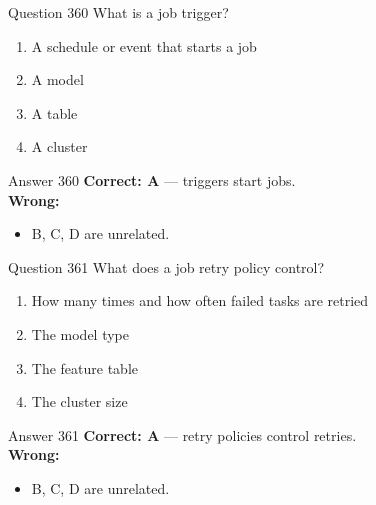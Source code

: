 \documentclass[aspectratio=169,11pt]{beamer}
\begin{document}
	\begin{frame}{Question 360}
		What is a job trigger?
		\begin{enumerate}[label=\Alph*.]
			\item A schedule or event that starts a job
			\item A model
			\item A table
			\item A cluster
		\end{enumerate}
	\end{frame}
	\begin{frame}{Answer 360}
		\textbf{Correct: A} --- triggers start jobs.\\
		\vspace{0.5em}
		\textbf{Wrong:}
		\begin{itemize}
			\item B, C, D are unrelated.
		\end{itemize}
	\end{frame}
	
	\begin{frame}{Question 361}
		What does a job retry policy control?
		\begin{enumerate}[label=\Alph*.]
			\item How many times and how often failed tasks are retried
			\item The model type
			\item The feature table
			\item The cluster size
		\end{enumerate}
	\end{frame}
	\begin{frame}{Answer 361}
		\textbf{Correct: A} --- retry policies control retries.\\
		\vspace{0.5em}
		\textbf{Wrong:}
		\begin{itemize}
			\item B, C, D are unrelated.
		\end{itemize}
	\end{frame}
	
\end{document}
